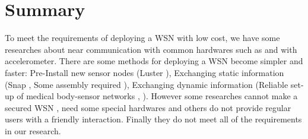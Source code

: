 \section{Summary}
To meet the requirements of deploying a WSN with low cost, we have some researches about near communication with common hardwares such as \cite{Mayrhofer:2007:SWB:1758156.1758168} and  \cite{vibconnect} with accelerometer. There are some methods for deploying a WSN become simpler and faster: Pre-Install new sensor nodes (Luster \cite{Selavo:2007:LWS:1322263.1322274}), Exchanging static information (Snap \cite{Duquennoy:2011:DSR:2070942.2071012}, Some assembly required  \cite{someassemblyrequired}), Exchanging dynamic information (Reliable set-up of medical body-sensor networks \cite{bodysensor}, \cite{Beigl:2006:UEU:1127777.1127832}). However some researches cannot make a secured WSN \cite{Duquennoy:2011:DSR:2070942.2071012}\cite{someassemblyrequired}\cite{Beigl:2006:UEU:1127777.1127832},  \cite{bodysensor} need some special hardwares and others \cite{Selavo:2007:LWS:1322263.1322274} do not provide regular users with a friendly interaction. Finally they do not meet all of the requirements in our research.%